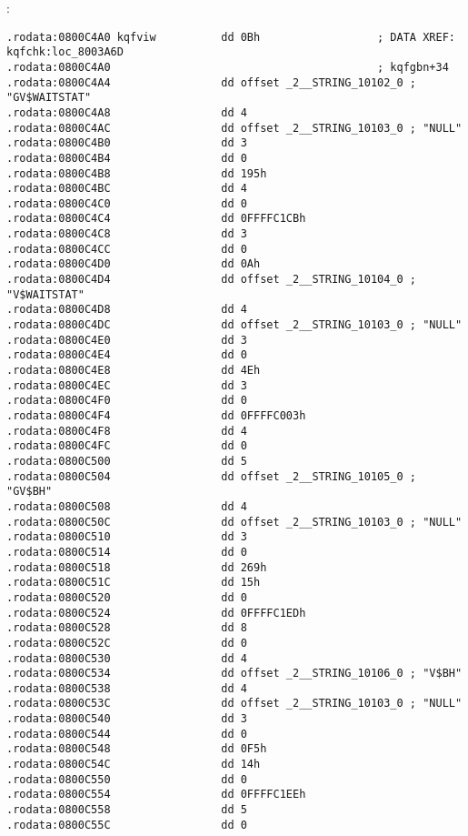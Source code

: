 
:

\begin{lstlisting}
.rodata:0800C4A0 kqfviw          dd 0Bh                  ; DATA XREF: kqfchk:loc_8003A6D
.rodata:0800C4A0                                         ; kqfgbn+34
.rodata:0800C4A4                 dd offset _2__STRING_10102_0 ; "GV$WAITSTAT"
.rodata:0800C4A8                 dd 4
.rodata:0800C4AC                 dd offset _2__STRING_10103_0 ; "NULL"
.rodata:0800C4B0                 dd 3
.rodata:0800C4B4                 dd 0
.rodata:0800C4B8                 dd 195h
.rodata:0800C4BC                 dd 4
.rodata:0800C4C0                 dd 0
.rodata:0800C4C4                 dd 0FFFFC1CBh
.rodata:0800C4C8                 dd 3
.rodata:0800C4CC                 dd 0
.rodata:0800C4D0                 dd 0Ah
.rodata:0800C4D4                 dd offset _2__STRING_10104_0 ; "V$WAITSTAT"
.rodata:0800C4D8                 dd 4
.rodata:0800C4DC                 dd offset _2__STRING_10103_0 ; "NULL"
.rodata:0800C4E0                 dd 3
.rodata:0800C4E4                 dd 0
.rodata:0800C4E8                 dd 4Eh
.rodata:0800C4EC                 dd 3
.rodata:0800C4F0                 dd 0
.rodata:0800C4F4                 dd 0FFFFC003h
.rodata:0800C4F8                 dd 4
.rodata:0800C4FC                 dd 0
.rodata:0800C500                 dd 5
.rodata:0800C504                 dd offset _2__STRING_10105_0 ; "GV$BH"
.rodata:0800C508                 dd 4
.rodata:0800C50C                 dd offset _2__STRING_10103_0 ; "NULL"
.rodata:0800C510                 dd 3
.rodata:0800C514                 dd 0
.rodata:0800C518                 dd 269h
.rodata:0800C51C                 dd 15h
.rodata:0800C520                 dd 0
.rodata:0800C524                 dd 0FFFFC1EDh
.rodata:0800C528                 dd 8
.rodata:0800C52C                 dd 0
.rodata:0800C530                 dd 4
.rodata:0800C534                 dd offset _2__STRING_10106_0 ; "V$BH"
.rodata:0800C538                 dd 4
.rodata:0800C53C                 dd offset _2__STRING_10103_0 ; "NULL"
.rodata:0800C540                 dd 3
.rodata:0800C544                 dd 0
.rodata:0800C548                 dd 0F5h
.rodata:0800C54C                 dd 14h
.rodata:0800C550                 dd 0
.rodata:0800C554                 dd 0FFFFC1EEh
.rodata:0800C558                 dd 5
.rodata:0800C55C                 dd 0
\end{lstlisting}

